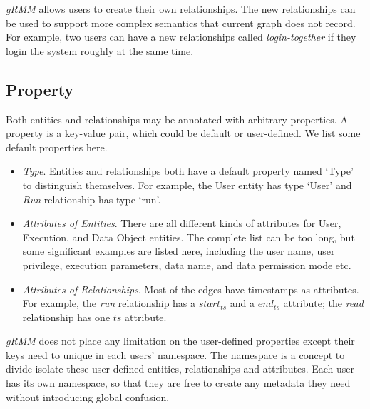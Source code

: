 \textit{gRMM} allows users to create their own relationships. The new relationships can be used to support more complex semantics that current graph does not record. For example, two users can have a new relationships called \textit{login-together} if they login the system roughly at the same time.


\subsection{Property}
Both entities and relationships may be annotated with arbitrary properties. A property is a key-value pair, which could be default or user-defined. We list some default properties here. 

\begin{itemize}
\item \textit{Type}. Entities and relationships both have a default property named `Type' to distinguish themselves. For example, the User entity has type `User' and \textit{Run} relationship has type `run'.

\item \textit{Attributes of Entities}. There are all different kinds of attributes for User, Execution, and Data Object entities. The complete list can be too long, but some significant examples are listed here, including the user name, user privilege, execution parameters, data name, and data permission mode etc.

\item \textit{Attributes of Relationships}. Most of the edges have timestamps as attributes. For example, the \textit{run} relationship has a $start_{ts}$ and a $end_{ts}$ attribute; the \textit{read} relationship has one $ts$ attribute. 

\end{itemize}

\textit{gRMM} does not place any limitation on the user-defined properties except their keys need to unique in each users' namespace. The namespace is a concept to divide isolate these user-defined entities, relationships and attributes. Each user has its own namespace, so that they are free to create any metadata they need without introducing global confusion.

